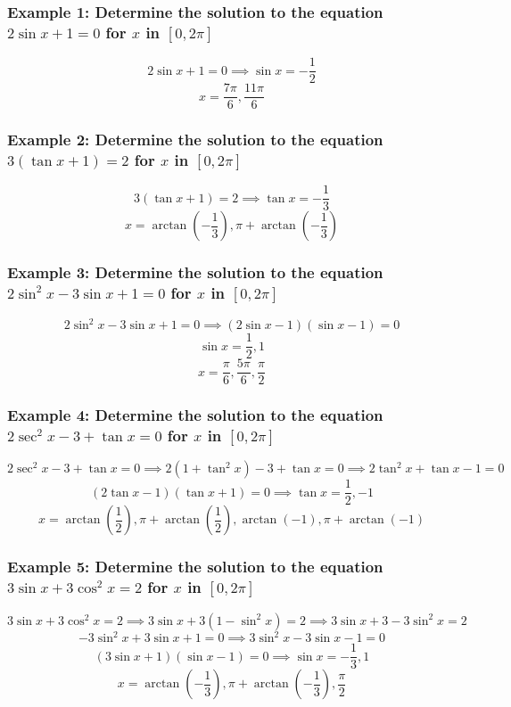 \documentclass{article}
\begin{document}
\subsubsection*{Example 1: Determine the solution to the equation \( 2\sin x + 1 = 0 \) for \( x \) in \([0, 2\pi]\)}

\[
2\sin x + 1 = 0 \implies \sin x = -\frac{1}{2}
\]
\[
x = \frac{7\pi}{6}, \frac{11\pi}{6}
\]

\subsubsection*{Example 2: Determine the solution to the equation \( 3(\tan x + 1) = 2 \) for \( x \) in \([0, 2\pi]\)}

\[
3(\tan x + 1) = 2 \implies \tan x = -\frac{1}{3}
\]
\[
x = \arctan\left(-\frac{1}{3}\right), \pi + \arctan\left(-\frac{1}{3}\right)
\]

\subsubsection*{Example 3: Determine the solution to the equation \( 2\sin^2 x - 3\sin x + 1 = 0 \) for \( x \) in \([0, 2\pi]\)}

\[
2\sin^2 x - 3\sin x + 1 = 0 \implies (2\sin x - 1)(\sin x - 1) = 0
\]
\[
\sin x = \frac{1}{2}, 1
\]
\[
x = \frac{\pi}{6}, \frac{5\pi}{6}, \frac{\pi}{2}
\]

\subsubsection*{Example 4: Determine the solution to the equation \( 2\sec^2 x - 3 + \tan x = 0 \) for \( x \) in \([0, 2\pi]\)}

\[
2\sec^2 x - 3 + \tan x = 0 \implies 2(1 + \tan^2 x) - 3 + \tan x = 0 \implies 2\tan^2 x + \tan x - 1 = 0
\]
\[
(2\tan x - 1)(\tan x + 1) = 0 \implies \tan x = \frac{1}{2}, -1
\]
\[
x = \arctan\left(\frac{1}{2}\right), \pi + \arctan\left(\frac{1}{2}\right), \arctan(-1), \pi + \arctan(-1)
\]

\subsubsection*{Example 5: Determine the solution to the equation \( 3\sin x + 3\cos^2 x = 2 \) for \( x \) in \([0, 2\pi]\)}

\[
3\sin x + 3\cos^2 x = 2 \implies 3\sin x + 3(1 - \sin^2 x) = 2 \implies 3\sin x + 3 - 3\sin^2 x = 2
\]
\[
-3\sin^2 x + 3\sin x + 1 = 0 \implies 3\sin^2 x - 3\sin x - 1 = 0
\]
\[
(3\sin x + 1)(\sin x - 1) = 0 \implies \sin x = -\frac{1}{3}, 1
\]
\[
x = \arctan(-\frac{1}{3}), \pi + \arctan(-\frac{1}{3}), \frac{\pi}{2}
\]
\end{document}
